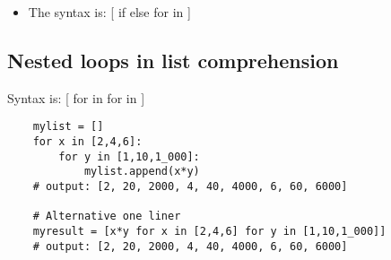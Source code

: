 \begin{itemize}
    \item The syntax is: [ if  else   for  in ]
\end{itemize}

\subsection{Nested loops in list comprehension}
Syntax is: [ for  in  for  in ]
\begin{verbatim}
    mylist = []
    for x in [2,4,6]:
        for y in [1,10,1_000]:
            mylist.append(x*y)
    # output: [2, 20, 2000, 4, 40, 4000, 6, 60, 6000]

    # Alternative one liner
    myresult = [x*y for x in [2,4,6] for y in [1,10,1_000]]
    # output: [2, 20, 2000, 4, 40, 4000, 6, 60, 6000]
\end{verbatim}

